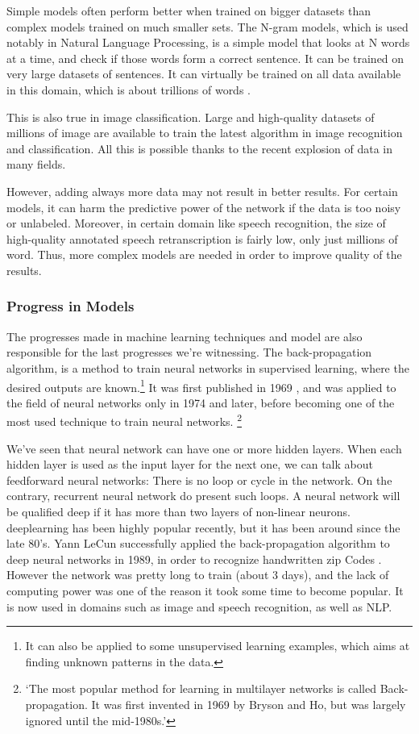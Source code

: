 \documentclass[12pt]{article}
\begin{document}
Simple models often perform better when trained on bigger datasets
\cite{moreData} than complex models trained on much smaller sets. The N-gram
models, which is used notably in Natural Language Processing, is a simple model
that looks at N words at a time, and check if those words form a correct
sentence. It can be trained on very large datasets of sentences. It can
virtually be trained on all data available in this domain, which is about
trillions of words \cite{ngram}.

This is also true in image classification. Large and high-quality datasets of
millions of image are available to train the latest algorithm in image
recognition and classification. All this is possible thanks to the recent
explosion of data in many fields.

However, adding always more data may not result in better results. For certain
models, it can harm the predictive power of the network if the data is too noisy
or unlabeled. \cite{trainingData} Moreover, in certain domain like speech
recognition, the size of high-quality annotated speech retranscription is fairly
low, only just millions of word. Thus, more complex models are needed in order
to improve quality of the results.


\subsubsection{Progress in Models}

The progresses made in machine learning techniques and model are also
responsible for the last progresses we're witnessing. The back-propagation
algorithm, is a method to train neural networks in supervised learning, where
the desired outputs are known.\footnote{It can also be applied to some
unsupervised learning examples, which aims at finding unknown patterns in the
data.} It was first published in 1969 \cite{backpropagation}, and was applied to
the field of neural networks only in 1974 and later, before becoming one of the
most used technique to train neural networks.
\footnote{\lq The most popular
method for learning in multilayer networks is called Back-propagation. It was
first invented in 1969 by Bryson and Ho, but was largely ignored until the
mid-1980s.\rq  \cite{RusselAI}}

We've seen that neural network can have one or more hidden layers. When each
hidden layer is used as the input layer for the next one, we can talk about
feedforward neural networks: There is no loop or cycle in the network. On the
contrary, recurrent neural network do present such loops. A neural network
will be qualified deep if it has more than two layers of non-linear neurons.
\gls{deeplearning} has been highly popular recently, but it has been around since the late
80's. Yann LeCun successfully applied the back-propagation algorithm to deep neural
networks in 1989, in order to recognize handwritten zip Codes \cite{lecun}.
However the network was pretty long to train (about 3 days), and the lack of computing
power was one of the reason it took some time to become popular. It is now
used in domains such as image and speech recognition, as well as NLP.
\end{document}
